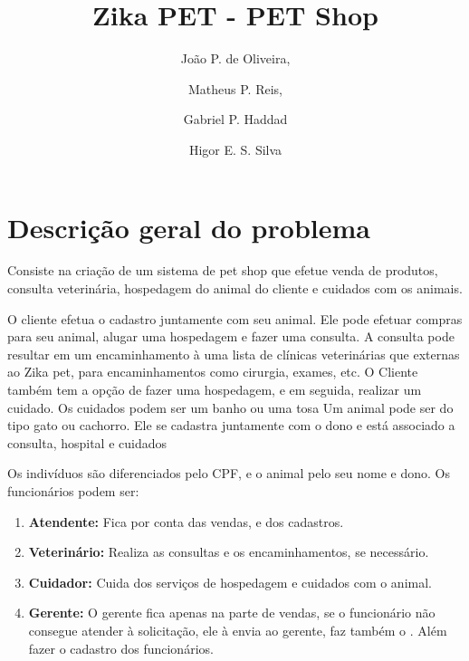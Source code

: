 \documentclass[12pt]{article}
\begin{document}
 \title{Zika PET - PET Shop}
\author{
	João P. de Oliveira,
    \and
    Matheus P. Reis,
    \and
     Gabriel P. Haddad
    \and
    Higor E. S. Silva
}
  \newpage                 
 \maketitle
 \newpage                 %
 \tableofcontents         %
  \newpage                 %
 \section{Descrição geral do problema}
 Consiste na criação de um sistema de pet shop que efetue venda de produtos, consulta veterinária, hospedagem do animal do cliente e cuidados com os animais.
 
 O cliente efetua o cadastro juntamente com seu animal. Ele pode efetuar compras para seu animal, alugar uma hospedagem e fazer uma consulta. A consulta pode resultar em um encaminhamento à uma lista de clínicas veterinárias que externas ao Zika pet, para encaminhamentos como cirurgia, exames, etc. 
 O Cliente também tem a opção de fazer uma hospedagem, e em seguida, realizar um cuidado. Os cuidados podem ser um banho ou uma tosa 
 Um animal pode ser do tipo gato ou cachorro. Ele se cadastra juntamente com o  dono e está associado a consulta, hospital e cuidados
 
 Os indivíduos são diferenciados pelo CPF, e o animal pelo seu nome e dono. Os funcionários podem ser:
 
\begin{enumerate}
\item \textbf{Atendente:} Fica por conta das vendas, e dos cadastros.

\item \textbf{Veterinário:} Realiza as consultas e os encaminhamentos, se necessário.

\item \textbf{Cuidador:} Cuida dos serviços de hospedagem e cuidados com o animal.

\item \textbf{Gerente:} O gerente fica apenas na parte de vendas, se o funcionário não consegue atender à solicitação, ele à envia ao gerente, faz também o . Além fazer o cadastro dos funcionários.
\end{enumerate}
 
\end{document}

